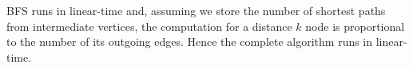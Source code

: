 BFS runs in linear-time and, assuming we store the number of shortest paths
from intermediate vertices, the computation for a distance $k$ node
is proportional to the number of its outgoing edges. Hence the complete
algorithm runs in linear-time.

\begin{comment}

Ian's solution---
 
Most of the problem we've considered involve finding a single optimum solution. Sometimes 
we may want to know the number of optimum solutions. For example, there may be multiple 
shortest paths between two vertices of a graph.

Develop a linear-time algorithm that computes the number of shortest paths from a vertex u 
to a vertex v in an undirected graph, where each edge weight is one.

The brute force algorithm for finding shortest paths (i.e. compute all possible paths) 
would give us an easy way to determine the number of optimal solutions but it is clearly 
not linear-time.

When we use a breadth-first search to compute shortest path, it is linear but we typically 
only get one shortest path - the algorithm explicitly ignores other possible paths, 
leaving a tree with only one path from the root to any node. However, if we store depths 
(aka path lengths) as well as found count as we traverse the graph, any time we 
encounter a node, we can see if the depth we're encountering it at now is the same as the 
shortest depth, and if so, increment the number of optimal paths counter. Then we simply 
look at this number for the target:

We can start by making a simple undirected graph G(v,e) as:
\begin{verbatim}
def MakeUndirectedGraph(v, e):
    # create an undirected graph of v nodes with e edges
    graph = {}
    for i in range(v):
        graph[i] = []
    while e > 0:
        v1, v2 = random.randint(0, (v - 1)), random.randint(0, (v - 1))
        if (v1 != v2) and v2 not in graph[v1]:
            graph[v1].append(v2)
            graph[v2].append(v1)
        e = e - 1
    return graph
\end{verbatim}


We can then use our variant of the standard iterative BFS algorithm, keeping a data 
structure with the best depth and found count as we go:

\begin{verbatim}
def NumShortestPaths(graph, source, target):
    nodes = {} # a hash table for storing the depth and found count, for each node
    queue = [] # a queue for BFS processing, which also stores the depth
    current_depth = 0
    queue.append((source, current_depth))
    nodes[source] = (current_depth, 1) # tuple of depth & found count
 

\end{comment}

